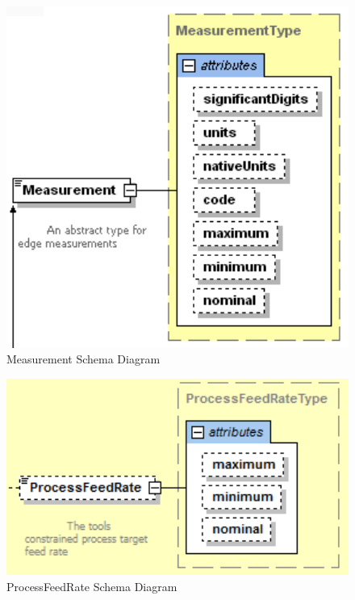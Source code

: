 \FloatBarrier


\begin{figure}[ht]
  \centering
    \includegraphics[width=1.0\textwidth]{figures/Measurement Schema.png}
  \caption{Measurement Schema Diagram}
  \label{fig:Measurement Schema Diagram}
\end{figure}

\FloatBarrier


\begin{figure}[ht]
  \centering
    \includegraphics[width=1.0\textwidth]{figures/ProcessFeedRate Schema.png}
  \caption{ProcessFeedRate Schema Diagram}
  \label{fig:ProcessFeedRate Schema Diagram}
\end{figure}

